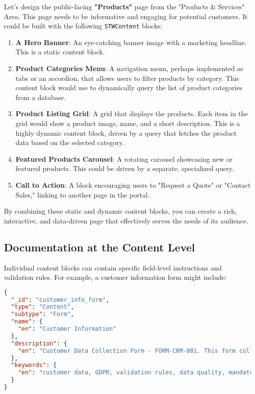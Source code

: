 Let's design the public-facing \textbf{"Products"} page from the "Products \& Services" Area. This page needs to be informative and engaging for potential customers. It could be built with the following \texttt{STWContent} blocks:

\begin{enumerate}
    \item \textbf{A Hero Banner}: An eye-catching banner image with a marketing headline. This is a static content block.
    \item \textbf{Product Categories Menu}: A navigation menu, perhaps implemented as tabs or an accordion, that allows users to filter products by category. This content block would use \wbpl{} to dynamically query the list of product categories from a database.
    \item \textbf{Product Listing Grid}: A grid that displays the products. Each item in the grid would show a product image, name, and a short description. This is a highly dynamic content block, driven by a \wbpl{} query that fetches the product data based on the selected category.
    \item \textbf{Featured Products Carousel}: A rotating carousel showcasing new or featured products. This could be driven by a separate, specialized query.
    \item \textbf{Call to Action}: A block encouraging users to "Request a Quote" or "Contact Sales," linking to another page in the portal.
\end{enumerate}

By combining these static and dynamic content blocks, you can create a rich, interactive, and data-driven page that effectively serves the needs of its audience.

\subsection{Documentation at the Content Level}
\label{sec:content-documentation}

Individual content blocks can contain specific field-level instructions and validation rules. For example, a customer information form might include:

\begin{lstlisting}[language=JSON,caption={Content with Field-Level Documentation},label={lst:form-content-docs}]
{
  "_id": "customer_info_form",
  "type": "Content",
  "subtype": "Form",
  "name": {
    "en": "Customer Information"
  },
  "description": {
    "en": "Customer Data Collection Form - FORM-CRM-001. This form collects essential customer information required for quote generation. All fields marked with (*) are mandatory as per our Customer Data Policy CDP-001. Data Validation Rules: Company Name (min 2, max 100 chars), Email (valid business format). Data Protection Notice: Customer data is processed according to GDPR Article 6(1)(b). Data retention period: 7 years."
  },
  "keywords": {
    "en": "customer data, GDPR, validation rules, data quality, mandatory fields"
  }
}
\end{lstlisting}

